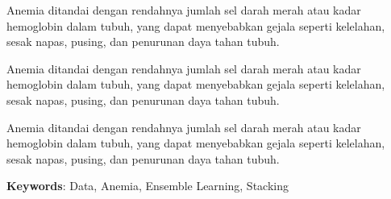 Anemia ditandai dengan rendahnya jumlah sel darah merah atau kadar hemoglobin dalam tubuh, yang dapat menyebabkan gejala seperti kelelahan, sesak napas, pusing, dan penurunan daya tahan tubuh.

Anemia ditandai dengan rendahnya jumlah sel darah merah atau kadar hemoglobin dalam tubuh, yang dapat menyebabkan gejala seperti kelelahan, sesak napas, pusing, dan penurunan daya tahan tubuh.

Anemia ditandai dengan rendahnya jumlah sel darah merah atau kadar hemoglobin dalam tubuh, yang dapat menyebabkan gejala seperti kelelahan, sesak napas, pusing, dan penurunan daya tahan tubuh. 

\vspace{0.5\baselineskip}

\noindent\textbf{Keywords}: Data, Anemia, Ensemble Learning, Stacking